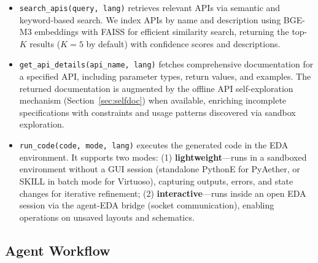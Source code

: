 \begin{itemize}
    \item \texttt{search\_apis(query, lang)} retrieves relevant APIs via semantic and keyword-based search. We index APIs by name and description using BGE-M3 embeddings \cite{bge2024} with FAISS \cite{douze2024faiss} for efficient similarity search, returning the top-$K$ results ($K=5$ by default) with confidence scores and descriptions.
    
    \item \texttt{get\_api\_details(api\_name, lang)} fetches comprehensive documentation for a specified API, including parameter types, return values, and examples. The returned documentation is augmented by the offline API self-exploration mechanism (Section~\ref{sec:selfdoc}) when available, enriching incomplete specifications with constraints and usage patterns discovered via sandbox exploration.
    
    \item \texttt{run\_code(code, mode, lang)} executes the generated code in the EDA environment. It supports two modes: (1) \textbf{lightweight}—runs in a sandboxed environment without a GUI session (standalone PythonE for PyAether, or SKILL in batch mode for Virtuoso), capturing outputs, errors, and state changes for iterative refinement; (2) \textbf{interactive}—runs inside an open EDA session via the agent-EDA bridge (socket communication), enabling operations on unsaved layouts and schematics.
\end{itemize}

\subsection{Agent Workflow}
\label{sec:agent-workflow}

